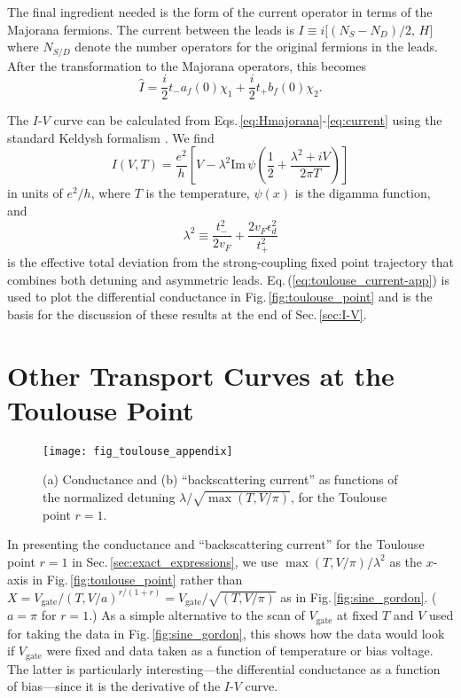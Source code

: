 \documentclass[aps,prb,reprint,floatfix,superscriptaddress,amssymb,amsmath]{revtex4-2}
\newcommand{\phdag}{{\phantom{\dagger}}}
\newcommand{\Vg}{V_\text{gate}}
\begin{document}
The final ingredient needed is the form of the current operator in terms of the Majorana fermions. The current between the leads is 
$I \equiv i \big[(N_S - N_D)/2,\, H\big]$ where $N_{S/D}$ denote the number operators for the original fermions in the leads. After the transformation to the Majorana operators, this becomes
\begin{equation}
\hat{I}  = \frac{i}{2} t_- a_f(0)\chi_1^\phdag + \frac{i}{2} t_+ b_f (0)\chi_2^\phdag .
\label{eq:current}
\end{equation} 

The $I$-$V$ curve can be calculated from Eqs.\,\eqref{eq:Hmajorana}-\eqref{eq:current} using the standard Keldysh formalism \cite{KamenevBook}. We find
\begin{equation}
I(V,T) =  \frac{e^2}{h}\left[ V -\lambda^2
\text{Im}\,\psi \left(\frac{1}{2}+\frac{\lambda^{2}+iV}{2\pi T} \right)\right]
\label{eq:toulouse_current-app}
\end{equation}
in units of $e^{2}/h$, where $T$ is the temperature, $\psi(x)$ is the digamma function, and 
\begin{equation}
\lambda^{2} \equiv \frac{t_-^2}{2 v_F} + \frac{2v_F  \epsilon_d^2}{t_+^2} 
\label{eq:DefLambda}
\end{equation}
is the effective total deviation from the strong-coupling fixed point trajectory that combines both detuning and asymmetric leads. Eq.\,(\ref{eq:toulouse_current-app}) is used to plot the differential conductance in Fig.\,\ref{fig:toulouse_point} and is the basis for the discussion of these results at the end of Sec.\,\ref{sec:I-V}.

\section{Other Transport Curves at the Toulouse Point}
\label{sec:other_toulouse}

\begin{figure}
\texttt{[image: fig\_toulouse\_appendix]}
\vspace*{-0.1cm}
\caption{\label{fig:toulouse_appendix}
(a) Conductance and (b) ``backscattering current'' as functions of the normalized detuning $\lambda/\sqrt{\max(T,V/\pi)}$, for the Toulouse point $r = 1$.
}
\end{figure}

In presenting the conductance and ``backscattering current'' for the Toulouse point $r\!=\!1$ in Sec.\,\ref{sec:exact_expressions}, we use $\max(T,V/\pi) /\lambda^2$ as the $x$-axis in Fig.\,\ref{fig:toulouse_point} rather than $X\!=\! \Vg/(T,V/a)^{r/(1+r)} \!=\!\Vg/\sqrt{(T,V/\pi)}$ as in Fig.\,\ref{fig:sine_gordon}. ($a\!=\!\pi$ for $r\!=\!1$.) As a simple alternative to the scan of $\Vg$ at fixed $T$ and $V$ used for taking the data in Fig.\,\ref{fig:sine_gordon}, this shows how the data would look if $\Vg$ were fixed and data taken as a function of temperature or bias voltage. The latter is particularly interesting---the differential conductance as a function of bias---since it is the derivative of the $I$-$V$ curve. 
\end{document}
